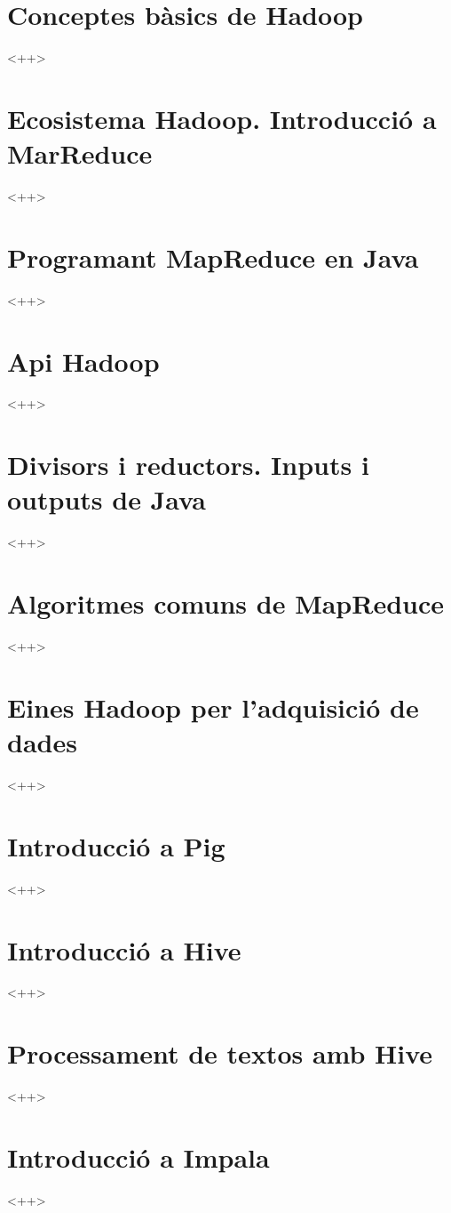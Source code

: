 \documentclass[a4paper]{article}
\begin{document}
\tableofcontents

\section{Conceptes bàsics de Hadoop}<++>

\section{Ecosistema Hadoop. Introducció a MarReduce}<++>

\section{Programant MapReduce en Java}<++>

\section{Api Hadoop}<++>

\section{Divisors i reductors. Inputs i outputs de Java}<++>

\section{Algoritmes comuns de MapReduce}<++>

\section{Eines Hadoop per l'adquisició de dades}<++>

\section{Introducció a Pig}<++>

\section{Introducció a Hive}<++>

\section{Processament de textos amb Hive}<++>

\section{Introducció a Impala}<++>
\end{document}
